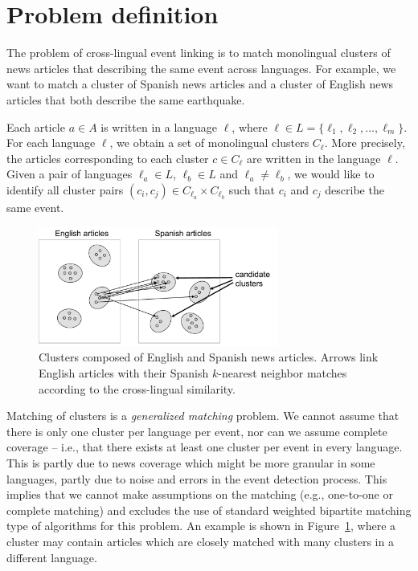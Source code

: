 \section{Problem definition}

The problem of cross-lingual event linking is to match monolingual clusters of news articles 
that describing the same event across languages. For example, we want to match a cluster of 
Spanish news articles and a cluster of English news articles that both describe the same earthquake.

Each article $a \in A$ is written in a language $\ell$, where $\ell \in L = \{\ell_1,\ell_2,...,\ell_m\}$. 
For each language $\ell$, we obtain a set of monolingual clusters $C_{\ell}$. More precisely, 
the articles corresponding to each cluster $c \in C_{\ell}$ are written in the language $\ell$. 
Given a pair of languages $\ell_a \in L$, $\ell_b \in L$ and $\ell_a \not= \ell_b$, we would like 
to identify all cluster pairs $(c_i, c_j) \in C_{\ell_a} \times C_{\ell_b}$ such that $c_i$ and $c_j$ describe the same event.

\begin{figure}[tb]
\centering
\includegraphics[width=0.7\textwidth]{figures/clusters.pdf}
\caption{\label{fig:clusters} Clusters composed of English and Spanish news articles. Arrows link English articles with their Spanish $k$-nearest neighbor matches according to the cross-lingual similarity.}
\end{figure}

Matching of clusters is a \emph{generalized matching} problem. We cannot assume that there is only 
one cluster per language per event, nor can we assume complete coverage -- i.e., that there exists 
at least one cluster per event in every language. This is partly due to news coverage which might 
be more granular in some languages, partly due to noise and errors in the event detection process. This 
implies that we cannot make assumptions on the matching (e.g., one-to-one or complete matching) and excludes 
the use of standard weighted bipartite matching type of algorithms for this problem. An example is shown in 
Figure~\ref{fig:clusters}, where a cluster may contain articles which are closely matched with many clusters in a different language.

